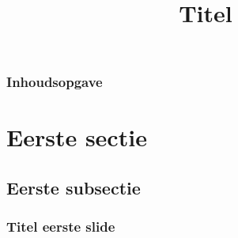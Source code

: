 \documentclass[aspectratio=169,sidebar,dyslexic]{uva-inf-presentation}
\title{Titel}
\begin{document}
\begin{titelframe}
\titlepage
\end{titelframe}

\begin{titelframe}
\frametitle{Inhoudsopgave}
\tableofcontents
\end{titelframe}

\section{Eerste sectie}
\subsection{Eerste subsectie}

\begin{frame}
\frametitle{Titel eerste slide}
\end{frame}

\end{document}
